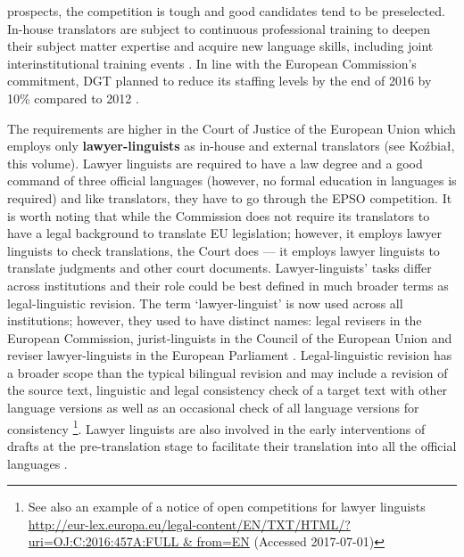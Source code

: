 \documentclass[output=paper]{langsci/langscibook}
\begin{document}
prospects, the competition is tough and good candidates tend to be preselected. In-house translators are subject to continuous professional training to deepen their subject matter expertise and acquire new language skills, including  joint interinstitutional training events \citep[8, 15]{DGT2016b}. In line with the European Commission’s commitment, DGT planned to reduce its staffing levels by the end of 2016 by 10\% compared to 2012 \citep[14]{DGT2016a}.

The requirements are higher in the Court of Justice of the European Union which employs only \textbf{lawyer-linguists} as in-house and external translators (see Koźbiał, this volume). Lawyer linguists are required to have a law degree and a good command of three official languages (however, no formal education in languages is required) and like translators, they have to go through the EPSO competition. It is worth noting that while the Commission does not require its translators to have a legal background to translate EU legislation; however, it employs lawyer linguists to check translations, the Court does — it employs lawyer linguists to translate judgments and other court documents. Lawyer-linguists’ tasks differ across institutions and their role could be best defined in much broader terms as legal-linguistic revision. The term ‘lawyer-linguist’ is now used across all institutions; however, they used to have distinct names: legal revisers in the European Commission, jurist-linguists in the Council of the European Union and reviser lawyer-linguists in the European Parliament \citep[186, 188, 189]{Šarčević2013}. Legal-linguistic revision has a broader scope than the typical bilingual revision and may include a revision of the source text, linguistic and legal consistency check of a target text with other language versions as well as an occasional check of all language versions for consistency \citep[186]{Šarčević2013}\footnote{See also an example of a notice of open competitions for lawyer linguists \url{http://eur-lex.europa.eu/legal-content/EN/TXT/HTML/?uri=OJ:C:2016:457A:FULL & from=EN} (Accessed 2017-07-01)}. Lawyer linguists are also involved in the early interventions of drafts at the pre-translation stage to facilitate their translation into all the official languages \citep[187]{Šarčević2013}. 
\end{document}
